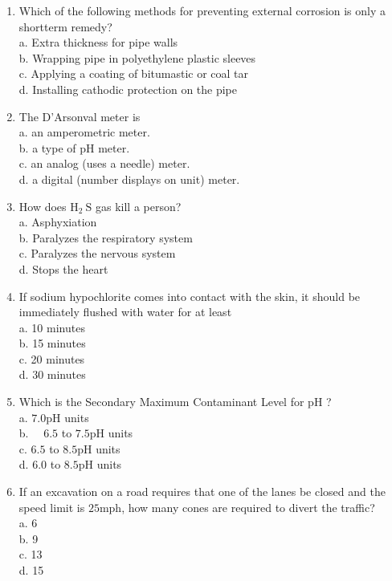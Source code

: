 \documentclass[10pt]{article}
\begin{document}
\begin{enumerate}
  \item Which of the following methods for preventing external corrosion is only a shortterm remedy?\\
a. Extra thickness for pipe walls\\
b. Wrapping pipe in polyethylene plastic sleeves\\
c. Applying a coating of bitumastic or coal tar\\
d. Installing cathodic protection on the pipe

  \item The D'Arsonval meter is\\
a. an amperometric meter.\\
b. a type of $\mathrm{pH}$ meter.\\
c. an analog (uses a needle) meter.\\
d. a digital (number displays on unit) meter.

  \item How does $\mathrm{H}_{2} \mathrm{~S}$ gas kill a person?\\
a. Asphyxiation\\
b. Paralyzes the respiratory system\\
c. Paralyzes the nervous system\\
d. Stops the heart

  \item If sodium hypochlorite comes into contact with the skin, it should be immediately flushed with water for at least\\
a. 10 minutes\\
b. 15 minutes\\
c. 20 minutes\\
d. 30 minutes

  \item Which is the Secondary Maximum Contaminant Level for $\mathrm{pH}$ ?\\
a. $7.0 \mathrm{pH}$ units\\
b. $\quad 6.5$ to $7.5 \mathrm{pH}$ units\\
c. $6.5$ to $8.5 \mathrm{pH}$ units\\
d. $6.0$ to $8.5 \mathrm{pH}$ units

  \item If an excavation on a road requires that one of the lanes be closed and the speed limit is $25 \mathrm{mph}$, how many cones are required to divert the traffic?\\
a. 6\\
b. 9\\
c. 13\\
d. 15


\end{enumerate}
\end{document}
